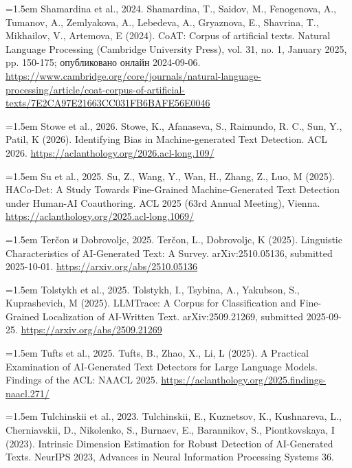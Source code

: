 \documentclass[11pt,a4paper]{article}
\renewcommand{\_}{\textunderscore\allowbreak}
\begin{document}
\noindent\hangindent=1.5em Shamardina et al., 2024. Shamardina, T., Saidov, M., Fenogenova, A., Tumanov, A., Zemlyakova, A., Lebedeva, A., Gryaznova, E., Shavrina, T., Mikhailov, V., Artemova, E (2024). CoAT: Corpus of artificial texts. Natural Language Processing (Cambridge University Press), vol. 31, no. 1, January 2025, pp. 150-175; опубликовано онлайн 2024-09-06. \url{https://www.cambridge.org/core/journals/natural-language-processing/article/coat-corpus-of-artificial-texts/7E2CA97E21663CC031FB6BAFE56E0046}\par\smallskip

\noindent\hangindent=1.5em Stowe et al., 2026. Stowe, K., Afanaseva, S., Raimundo, R. C., Sun, Y., Patil, K (2026). Identifying Bias in Machine-generated Text Detection. ACL 2026. \url{https://aclanthology.org/2026.acl-long.109/}\par\smallskip

\noindent\hangindent=1.5em Su et al., 2025. Su, Z., Wang, Y., Wan, H., Zhang, Z., Luo, M (2025). HACo-Det: A Study Towards Fine-Grained Machine-Generated Text Detection under Human-AI Coauthoring. ACL 2025 (63rd Annual Meeting), Vienna. \url{https://aclanthology.org/2025.acl-long.1069/}\par\smallskip

\noindent\hangindent=1.5em Ter\v{c}on и Dobrovoljc, 2025. Ter\v{c}on, L., Dobrovoljc, K (2025). Linguistic Characteristics of AI-Generated Text: A Survey. arXiv:2510.05136, submitted 2025-10-01. \url{https://arxiv.org/abs/2510.05136}\par\smallskip

\noindent\hangindent=1.5em Tolstykh et al., 2025. Tolstykh, I., Tsybina, A., Yakubson, S., Kuprashevich, M (2025). LLMTrace: A Corpus for Classification and Fine-Grained Localization of AI-Written Text. arXiv:2509.21269, submitted 2025-09-25. \url{https://arxiv.org/abs/2509.21269}\par\smallskip

\noindent\hangindent=1.5em Tufts et al., 2025. Tufts, B., Zhao, X., Li, L (2025). A Practical Examination of AI-Generated Text Detectors for Large Language Models. Findings of the ACL: NAACL 2025. \url{https://aclanthology.org/2025.findings-naacl.271/}\par\smallskip

\noindent\hangindent=1.5em Tulchinskii et al., 2023. Tulchinskii, E., Kuznetsov, K., Kushnareva, L., Cherniavskii, D., Nikolenko, S., Burnaev, E., Barannikov, S., Piontkovskaya, I (2023). Intrinsic Dimension Estimation for Robust Detection of AI-Generated Texts. NeurIPS 2023, Advances in Neural Information Processing Systems 36.\par\smallskip
\end{document}
